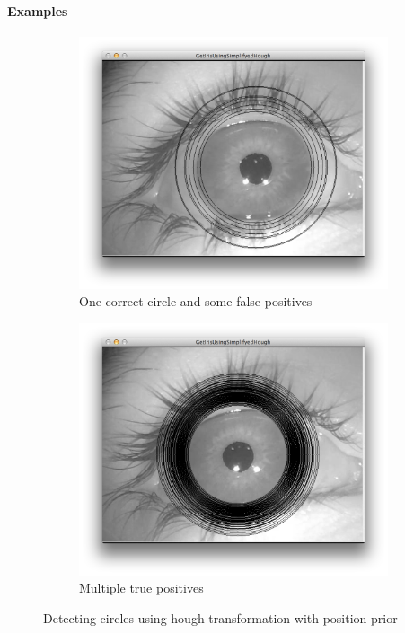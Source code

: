 \documentclass[a4paper,11pt]{article}
\begin{document}
\paragraph{Examples}
\label{par:examples}
\begin{figure}[H]
\centering
\begin{subfigure}{.48\textwidth}
  \centering
  \includegraphics[width=.8\linewidth]{circhoughavg}
  \caption{One correct circle and some false positives}
  \label{fig:circhoughavg}
\end{subfigure}
\begin{subfigure}{.48\textwidth}
  \centering
  \includegraphics[width=.8\linewidth]{circhoughgood}
  \caption{Multiple true positives}
  \label{fig:circhoughgood}
\end{subfigure}
\caption{Detecting circles using hough transformation with position prior }
\label{fig:houghcircles}
\end{figure}
\end{document}
